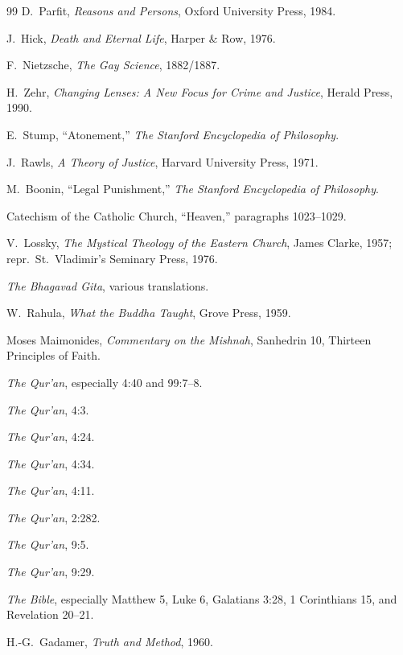\documentclass[11pt]{article}
\theoremstyle{remark}
\theoremstyle{plain}
\begin{document}
\begin{thebibliography}{99}
D.\ Parfit,
\emph{Reasons and Persons},
Oxford University Press, 1984.

J.\ Hick,
\emph{Death and Eternal Life},
Harper \& Row, 1976.

F.\ Nietzsche,
\emph{The Gay Science},
1882/1887.

H.\ Zehr,
\emph{Changing Lenses: A New Focus for Crime and Justice},
Herald Press, 1990.

E.\ Stump,
``Atonement,''
\emph{The Stanford Encyclopedia of Philosophy}.

J.\ Rawls,
\emph{A Theory of Justice},
Harvard University Press, 1971.

M.\ Boonin,
``Legal Punishment,''
\emph{The Stanford Encyclopedia of Philosophy}.

Catechism of the Catholic Church,
``Heaven,'' paragraphs 1023--1029.

V.\ Lossky,
\emph{The Mystical Theology of the Eastern Church},
James Clarke, 1957; repr.\ St.\ Vladimir's Seminary Press, 1976.

\emph{The Bhagavad Gita},
various translations.

W.\ Rahula,
\emph{What the Buddha Taught},
Grove Press, 1959.

Moses Maimonides,
\emph{Commentary on the Mishnah}, Sanhedrin 10, Thirteen Principles of Faith.

\emph{The Qur'an},
especially 4:40 and 99:7--8.

\emph{The Qur'an}, 4:3.

\emph{The Qur'an}, 4:24.

\emph{The Qur'an}, 4:34.

\emph{The Qur'an}, 4:11.

\emph{The Qur'an}, 2:282.

\emph{The Qur'an}, 9:5.

\emph{The Qur'an}, 9:29.

\emph{The Bible},
especially Matthew 5, Luke 6, Galatians 3:28, 1 Corinthians 15, and
Revelation 20--21.

H.-G.\ Gadamer,
\emph{Truth and Method},
1960.


\end{thebibliography}
\end{document}
